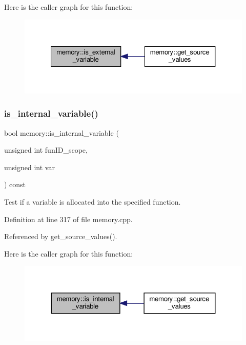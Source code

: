 Here is the caller graph for this function\+:
\nopagebreak
\begin{figure}[H]
\begin{center}
\leavevmode
\includegraphics[width=327pt]{d8/d99/classmemory_a01bcc5c735b622564c5a2498d3547300_icgraph}
\end{center}
\end{figure}
\mbox{\label{classmemory_af55ea4821a53abef7a412425aa50467c}} 
\subsubsection{\texorpdfstring{is\+\_\+internal\+\_\+variable()}{is\_internal\_variable()}}
{\footnotesize\ttfamily bool memory\+::is\+\_\+internal\+\_\+variable (\begin{DoxyParamCaption}\item[{unsigned int}]{fun\+I\+D\+\_\+scope,  }\item[{unsigned int}]{var }\end{DoxyParamCaption}) const}



Test if a variable is allocated into the specified function. 



Definition at line 317 of file memory.\+cpp.



Referenced by get\+\_\+source\+\_\+values().

Here is the caller graph for this function\+:
\nopagebreak
\begin{figure}[H]
\begin{center}
\leavevmode
\includegraphics[width=324pt]{d8/d99/classmemory_af55ea4821a53abef7a412425aa50467c_icgraph}
\end{center}
\end{figure}
\mbox{\label{classmemory_ab5e7b68f10177f4a17cfab6d711dab49}} 
